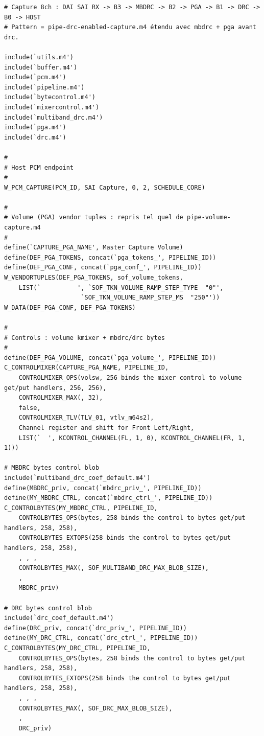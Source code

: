 \documentclass[11pt,a4paper]{article}
\begin{document}
\begin{lstlisting}[language={}, basicstyle=\ttfamily\scriptsize]
# Capture 8ch : DAI SAI RX -> B3 -> MBDRC -> B2 -> PGA -> B1 -> DRC -> B0 -> HOST
# Pattern = pipe-drc-enabled-capture.m4 étendu avec mbdrc + pga avant drc.

include(`utils.m4')
include(`buffer.m4')
include(`pcm.m4')
include(`pipeline.m4')
include(`bytecontrol.m4')
include(`mixercontrol.m4')
include(`multiband_drc.m4')
include(`pga.m4')
include(`drc.m4')

#
# Host PCM endpoint
#
W_PCM_CAPTURE(PCM_ID, SAI Capture, 0, 2, SCHEDULE_CORE)

#
# Volume (PGA) vendor tuples : repris tel quel de pipe-volume-capture.m4
#
define(`CAPTURE_PGA_NAME', Master Capture Volume)
define(DEF_PGA_TOKENS, concat(`pga_tokens_', PIPELINE_ID))
define(DEF_PGA_CONF, concat(`pga_conf_', PIPELINE_ID))
W_VENDORTUPLES(DEF_PGA_TOKENS, sof_volume_tokens,
    LIST(`          ', `SOF_TKN_VOLUME_RAMP_STEP_TYPE  "0"',
                     `SOF_TKN_VOLUME_RAMP_STEP_MS  "250"'))
W_DATA(DEF_PGA_CONF, DEF_PGA_TOKENS)

#
# Controls : volume kmixer + mbdrc/drc bytes
#
define(DEF_PGA_VOLUME, concat(`pga_volume_', PIPELINE_ID))
C_CONTROLMIXER(CAPTURE_PGA_NAME, PIPELINE_ID,
    CONTROLMIXER_OPS(volsw, 256 binds the mixer control to volume get/put handlers, 256, 256),
    CONTROLMIXER_MAX(, 32),
    false,
    CONTROLMIXER_TLV(TLV_01, vtlv_m64s2),
    Channel register and shift for Front Left/Right,
    LIST(`  ', KCONTROL_CHANNEL(FL, 1, 0), KCONTROL_CHANNEL(FR, 1, 1)))

# MBDRC bytes control blob
include(`multiband_drc_coef_default.m4')
define(MBDRC_priv, concat(`mbdrc_priv_', PIPELINE_ID))
define(MY_MBDRC_CTRL, concat(`mbdrc_ctrl_', PIPELINE_ID))
C_CONTROLBYTES(MY_MBDRC_CTRL, PIPELINE_ID,
    CONTROLBYTES_OPS(bytes, 258 binds the control to bytes get/put handlers, 258, 258),
    CONTROLBYTES_EXTOPS(258 binds the control to bytes get/put handlers, 258, 258),
    , , ,
    CONTROLBYTES_MAX(, SOF_MULTIBAND_DRC_MAX_BLOB_SIZE),
    ,
    MBDRC_priv)

# DRC bytes control blob
include(`drc_coef_default.m4')
define(DRC_priv, concat(`drc_priv_', PIPELINE_ID))
define(MY_DRC_CTRL, concat(`drc_ctrl_', PIPELINE_ID))
C_CONTROLBYTES(MY_DRC_CTRL, PIPELINE_ID,
    CONTROLBYTES_OPS(bytes, 258 binds the control to bytes get/put handlers, 258, 258),
    CONTROLBYTES_EXTOPS(258 binds the control to bytes get/put handlers, 258, 258),
    , , ,
    CONTROLBYTES_MAX(, SOF_DRC_MAX_BLOB_SIZE),
    ,
    DRC_priv)


\end{lstlisting}
\end{document}

